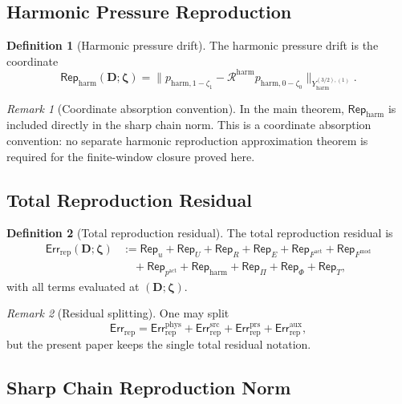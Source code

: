 \documentclass[11pt]{article}
\numberwithin{equation}{section}
\theoremstyle{definition}
\newtheorem{definition}[definition]{Definition}
\theoremstyle{remark}
\newtheorem{remark}[remark]{Remark}
\newcommand{\prs}{\mathrm{prs}}
\newcommand{\harm}{\mathrm{harm}}
\newcommand{\src}{\mathrm{src}}
\newcommand{\rep}{\mathrm{rep}}
\newcommand{\Err}{\mathsf{Err}}
\newcommand{\Rep}{\mathsf{Rep}}
\newcommand{\calR}{\mathcal R}
\newcommand{\bD}{\mathbf D}
\newcommand{\bzeta}{\boldsymbol\zeta}
\begin{document}
\subsection{Harmonic Pressure Reproduction}
\label{rep:sec:harmonic-reproduction}

\begin{definition}[Harmonic pressure drift]
\label{rep:def:harmonic-pressure-drift}
The harmonic pressure drift is the coordinate
\[
    \Rep_{\harm}(\bD;\bzeta)
    =
    \|p_{\harm,1-\zeta_1}
    -
    \calR^{\harm}p_{\harm,0-\zeta_0}\|_{Y_{\harm}^{(3/2),(1)}}.
\]
\end{definition}

\begin{remark}[Coordinate absorption convention]
In the main theorem, \(\Rep_{\harm}\) is included directly in the sharp
chain norm.  This is a coordinate absorption convention: no separate harmonic
reproduction approximation theorem is required for the finite-window closure
proved here.
\end{remark}

\subsection{Total Reproduction Residual}
\label{rep:sec:total-residual}

\begin{definition}[Total reproduction residual]
\label{rep:def:total-reproduction-residual}
The total reproduction residual is
\[
\begin{aligned}
    \Err_{\rep}(\bD;\bzeta)
    &:=
    \Rep_u+\Rep_U+\Rep_R+\Rep_E
    +
    \Rep_{F^{\mathrm{act}}}
    +
    \Rep_{F^{\mathrm{mod}}}
\\
    &\quad+
    \Rep_{p^{\mathrm{act}}}
    +
    \Rep_{\harm}
    +
    \Rep_{\Pi}
    +
    \Rep_{\Phi}
    +
    \Rep_T,
\end{aligned}
\]
with all terms evaluated at \((\bD;\bzeta)\).
\end{definition}

\begin{remark}[Residual splitting]
One may split
\[
    \Err_{\rep}
    =
    \Err_{\rep}^{\mathrm{phys}}
    +
    \Err_{\rep}^{\src}
    +
    \Err_{\rep}^{\prs}
    +
    \Err_{\rep}^{\mathrm{aux}},
\]
but the present paper keeps the single total residual notation.
\end{remark}

\subsection{Sharp Chain Reproduction Norm}
\label{rep:sec:chain-norm}
\end{document}
